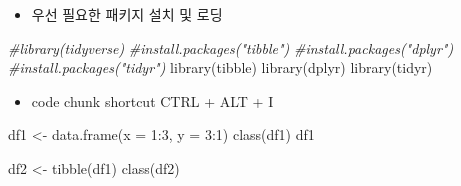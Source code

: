 \documentclass[
]{book}
\newenvironment{Shaded}{\begin{snugshade}}{\end{snugshade}}
\newcommand{\AttributeTok}[1]{\textcolor[rgb]{0.77,0.63,0.00}{#1}}
\newcommand{\CommentTok}[1]{\textcolor[rgb]{0.56,0.35,0.01}{\textit{#1}}}
\newcommand{\DecValTok}[1]{\textcolor[rgb]{0.00,0.00,0.81}{#1}}
\newcommand{\FunctionTok}[1]{\textcolor[rgb]{0.00,0.00,0.00}{#1}}
\newcommand{\NormalTok}[1]{#1}
\newcommand{\OtherTok}[1]{\textcolor[rgb]{0.56,0.35,0.01}{#1}}
\newcommand{\SpecialCharTok}[1]{\textcolor[rgb]{0.00,0.00,0.00}{#1}}
\providecommand{\tightlist}{%
  \setlength{\itemsep}{0pt}\setlength{\parskip}{0pt}}
\begin{document}
\begin{itemize}
\tightlist
\item
  우선 필요한 패키지 설치 및 로딩
\end{itemize}

\begin{Shaded}
\begin{Highlighting}[]
\CommentTok{\#library(tidyverse)}
\CommentTok{\#install.packages("tibble")}
\CommentTok{\#install.packages("dplyr")}
\CommentTok{\#install.packages("tidyr")}
\FunctionTok{library}\NormalTok{(tibble)}
\FunctionTok{library}\NormalTok{(dplyr)}
\FunctionTok{library}\NormalTok{(tidyr)}
\end{Highlighting}
\end{Shaded}

\begin{itemize}
\tightlist
\item
  code chunk shortcut CTRL + ALT + I
\end{itemize}

\begin{Shaded}
\begin{Highlighting}[]
\NormalTok{df1 }\OtherTok{\textless{}{-}} \FunctionTok{data.frame}\NormalTok{(}\AttributeTok{x =} \DecValTok{1}\SpecialCharTok{:}\DecValTok{3}\NormalTok{, }\AttributeTok{y =} \DecValTok{3}\SpecialCharTok{:}\DecValTok{1}\NormalTok{)}
\FunctionTok{class}\NormalTok{(df1)}
\NormalTok{df1}

\NormalTok{df2 }\OtherTok{\textless{}{-}} \FunctionTok{tibble}\NormalTok{(df1)}
\FunctionTok{class}\NormalTok{(df2)}
\end{Highlighting}
\end{Shaded}
\end{document}

